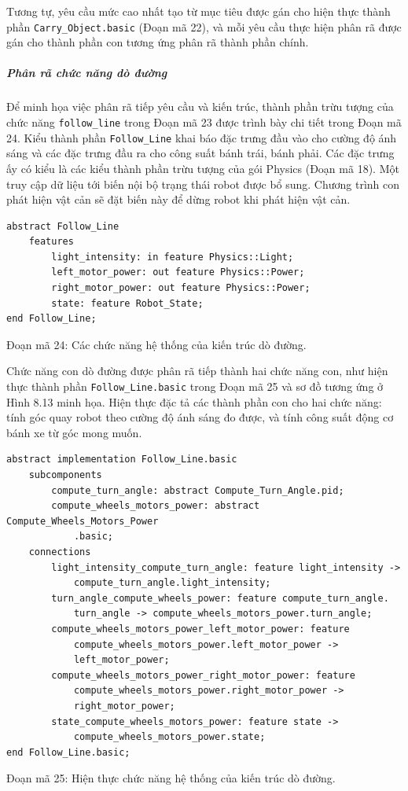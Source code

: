 Tương tự, yêu cầu mức cao nhất tạo từ mục tiêu được gán cho hiện thực thành phần \texttt{Carry\_Object.basic} (Đoạn mã 22), và mỗi yêu cầu thực hiện phân rã được gán cho thành phần con tương ứng phân rã thành phần chính.

\subparagraph{Phân rã chức năng dò đường}
Để minh họa việc phân rã tiếp yêu cầu và kiến trúc, thành phần trừu tượng của chức năng \texttt{follow\_line} trong Đoạn mã 23 được trình bày chi tiết trong Đoạn mã 24. Kiểu thành phần \texttt{Follow\_Line} khai báo đặc trưng đầu vào cho cường độ ánh sáng và các đặc trưng đầu ra cho công suất bánh trái, bánh phải. Các đặc trưng ấy có kiểu là các kiểu thành phần trừu tượng của gói Physics (Đoạn mã 18). Một truy cập dữ liệu tới biến nội bộ trạng thái robot được bổ sung. Chương trình con phát hiện vật cản sẽ đặt biến này để dừng robot khi phát hiện vật cản.
\begin{verbatim}
abstract Follow_Line
    features
        light_intensity: in feature Physics::Light;
        left_motor_power: out feature Physics::Power;
        right_motor_power: out feature Physics::Power;
        state: feature Robot_State;
end Follow_Line;
\end{verbatim}
\begin{center}\small Đoạn mã 24: Các chức năng hệ thống của kiến trúc dò đường.\end{center}

Chức năng con dò đường được phân rã tiếp thành hai chức năng con, như hiện thực thành phần \texttt{Follow\_Line.basic} trong Đoạn mã 25 và sơ đồ tương ứng ở Hình 8.13 minh họa. Hiện thực đặc tả các thành phần con cho hai chức năng: tính góc quay robot theo cường độ ánh sáng đo được, và tính công suất động cơ bánh xe từ góc mong muốn.

\begin{verbatim}
abstract implementation Follow_Line.basic
    subcomponents
        compute_turn_angle: abstract Compute_Turn_Angle.pid;
        compute_wheels_motors_power: abstract Compute_Wheels_Motors_Power
            .basic;
    connections
        light_intensity_compute_turn_angle: feature light_intensity ->
            compute_turn_angle.light_intensity;
        turn_angle_compute_wheels_power: feature compute_turn_angle.
            turn_angle -> compute_wheels_motors_power.turn_angle;
        compute_wheels_motors_power_left_motor_power: feature
            compute_wheels_motors_power.left_motor_power ->
            left_motor_power;
        compute_wheels_motors_power_right_motor_power: feature
            compute_wheels_motors_power.right_motor_power ->
            right_motor_power;
        state_compute_wheels_motors_power: feature state ->
            compute_wheels_motors_power.state;
end Follow_Line.basic;
\end{verbatim}
\begin{center}\small Đoạn mã 25: Hiện thực chức năng hệ thống của kiến trúc dò đường.\end{center}

